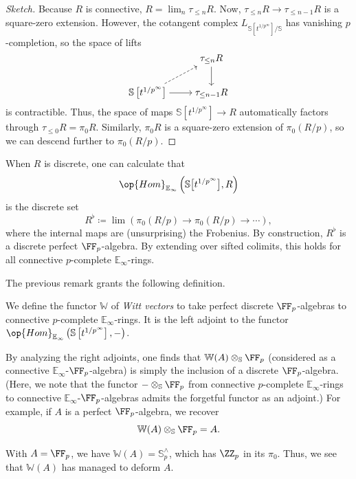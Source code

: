 \documentclass[../notes.tex]{subfiles}
\begin{document}
\begin{proof}[Sketch]
	Because $R$ is connective, $R=\lim_n\tau_{\le n}R$. Now, $\tau_{\le n}R\to\tau_{\le n-1}R$ is a square-zero extension. However, the cotangent complex $L_{\mathbb S\left[t^{1/p^\infty}\right]/\mathbb S}$ has vanishing $p$-completion, so the space of lifts
	\[\begin{tikzcd}[cramped]
		& {\tau_{\le n}R} \\
		{\mathbb S\left[t^{1/p^\infty}\right]} & {\tau_{\le n-1}R}
		\arrow[from=1-2, to=2-2]
		\arrow[dashed, from=2-1, to=1-2]
		\arrow[from=2-1, to=2-2]
	\end{tikzcd}\]
	is contractible. Thus, the space of maps $\mathbb S\left[t^{1/p^\infty}\right]\to R$ automatically factors through $\tau_{\le0}R=\pi_0R$. Similarly, $\pi_0R$ is a square-zero extension of $\pi_0(R/p)$, so we can descend further to $\pi_0(R/p)$.
\end{proof}
\begin{remark}
	When $R$ is discrete, one can calculate that
	\[\op{Hom}_{\mathbb E_\infty}\left(\mathbb S\big[t^{1/p^\infty}\big],R\right)\]
	is the discrete set
	\[R^\flat\coloneqq\lim\left(\pi_0(R/p)\to\pi_0(R/p)\to\cdots\right),\]
	where the internal maps are (unsurprising) the Frobenius. By construction, $R^\flat$ is a discrete perfect $\FF_p$-algebra. By extending over sifted colimits, this holds for all connective $p$-complete $\mathbb E_\infty$-rings.
\end{remark}
The previous remark grants the following definition.
\begin{definition}
	We define the functor $\mathbb W$ of \textit{Witt vectors} to take perfect discrete $\FF_p$-algebras to connective $p$-complete $\mathbb E_\infty$-rings. It is the left adjoint to the functor $\op{Hom}_{\mathbb E_\infty}\left(\mathbb S\left[t^{1/p^\infty}\right],-\right)$.
\end{definition}
\begin{example}
	By analyzing the right adjoints, one finds that $\mathbb W(A)\otimes_{\mathbb S}\FF_p$ (considered as a connective $\mathbb E_\infty$-$\FF_p$-algebra) is simply the inclusion of a discrete $\FF_p$-algebra. (Here, we note that the functor $-\otimes_{\mathbb S}\FF_p$ from connective $p$-complete $\mathbb E_\infty$-rings to connective $\mathbb E_\infty$-$\FF_p$-algebras admits the forgetful functor as an adjoint.) For example, if $A$ is a perfect $\FF_p$-algebra, we recover
	\[\mathbb W(A)\otimes_{\mathbb S}\FF_p=A.\]
\end{example}
\begin{example}
	With $A=\FF_p$, we have $\mathbb W(A)=\mathbb S^\land_p$, which has $\ZZ_p$ in its $\pi_0$. Thus, we see that $\mathbb W(A)$ has managed to deform $A$.
\end{example}
\end{document}
